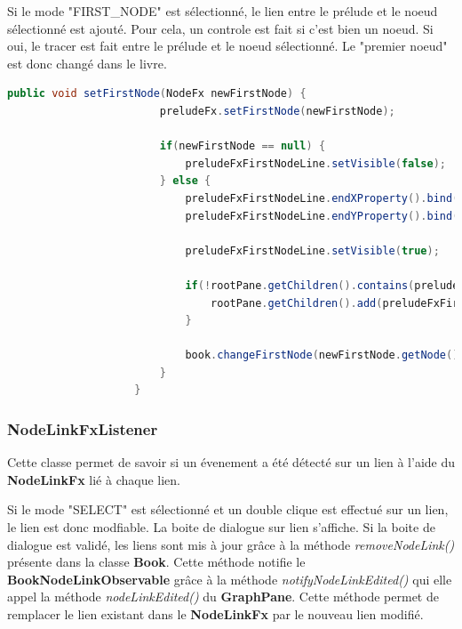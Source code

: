 				Si le mode "FIRST\_NODE" est sélectionné, le lien entre le prélude et le noeud sélectionné est ajouté. Pour cela, un controle est fait si c'est bien un noeud. Si oui, le tracer est fait entre le prélude et le noeud sélectionné. Le "premier noeud" est donc changé dans le livre.
				\begin{lstlisting}[gobble=12, language=java, caption=Classe NodeFxListener avec le mode FIRST NODE]
					public void setFirstNode(NodeFx newFirstNode) {
						preludeFx.setFirstNode(newFirstNode);

						if(newFirstNode == null) {
							preludeFxFirstNodeLine.setVisible(false);
						} else {
							preludeFxFirstNodeLine.endXProperty().bind(newFirstNode.xProperty().add(newFirstNode.widthProperty().divide(2)));
							preludeFxFirstNodeLine.endYProperty().bind(newFirstNode.yProperty().add(newFirstNode.heightProperty().divide(2)));

							preludeFxFirstNodeLine.setVisible(true);

							if(!rootPane.getChildren().contains(preludeFxFirstNodeLine)) {
								rootPane.getChildren().add(preludeFxFirstNodeLine);
							}

							book.changeFirstNode(newFirstNode.getNode());
						}
					}
				\end{lstlisting}

			\subsubsection{NodeLinkFxListener}
				Cette classe permet de savoir si un évenement a été détecté sur un lien à l'aide du \textbf{NodeLinkFx} lié à chaque lien.

				Si le mode "SELECT" est sélectionné et un double clique est effectué sur un lien, le lien est donc modfiable. La boite de dialogue sur lien s'affiche. Si la boite de dialogue est validé, les liens sont mis à jour grâce à la méthode \textit{removeNodeLink()} présente dans la classe \textbf{Book}. Cette méthode notifie le \textbf{BookNodeLinkObservable} grâce à la méthode \textit{notifyNodeLinkEdited()} qui elle appel la méthode \textit{nodeLinkEdited()} du \textbf{GraphPane}. Cette méthode permet de remplacer le lien existant dans le \textbf{NodeLinkFx} par le nouveau lien modifié.

